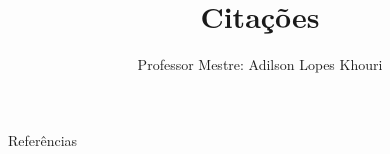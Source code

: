 \documentclass[compress, hyperref={pdfpagelayout=SinglePage}]{beamer}
\title[TCC II - Aula 04]{Citações}
\author{Professor Mestre: Adilson Lopes Khouri}
\begin{document}
	
	\begin{frame}
		\titlepage
	\end{frame}
	
	
	
	

	
	
	
		
	
	
	
	
	\begin{frame}[allowframebreaks]{Referências}
			\tiny
			\nocite{*}
			
	    		
	\end{frame}
	
	
\end{document}
